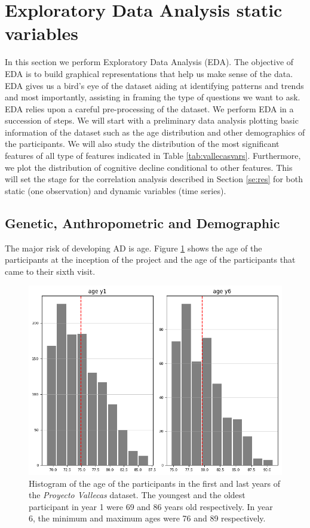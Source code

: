 \documentclass[11pt]{article}
\theoremstyle{definition}
\theoremstyle{remark}
\begin{document}
\section{Exploratory Data Analysis static variables}
\label{sse:eda}
In this section we perform Exploratory Data Analysis (EDA). The objective of EDA is to build graphical representations that help us make sense of the data. EDA gives us a bird's eye of the dataset aiding at identifying patterns and trends and most importantly, assisting in framing the type of questions we want to ask.
EDA relies upon a careful pre-processing of the dataset. We perform EDA in a succession of steps. We will start with a preliminary data analysis plotting basic information of the dataset such as the age distribution and other demographics of the participants. 
We will also study the distribution of the most significant features of all type of features indicated in Table \ref{tab:vallecasvars}. Furthermore, we plot the distribution of cognitive decline conditional to other features. This will set the stage for the correlation analysis described in Section \ref{se:res} for both static (one observation) and dynamic variables (time series).


\subsection{Genetic, Anthropometric and Demographic}
\label{ssse:ant}

The major risk of developing AD is age. Figure \ref{fig:ages} shows the age of the participants at the inception of the project and the age of the participants that came to their sixth visit.

\begin{figure}[H]
        \centering
        \includegraphics[keepaspectratio, width=.6\linewidth]{figures/Fig_ages}
        \caption{Histogram of the age of the participants in the first and last years of the \emph{Proyecto Vallecas} dataset. The youngest and the oldest participant in year 1 were 69 and 86 years old respectively. In year 6, the minimum and maximum ages were 76 and 89 respectively.} 
        \label{fig:ages}
\end{figure}
\end{document}

